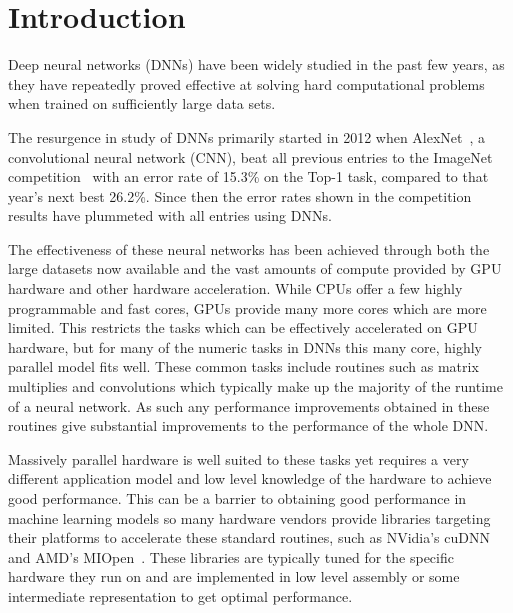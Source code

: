 \documentclass[sigconf]{acmart}
\begin{document}
\section{Introduction}

Deep neural networks (DNNs) have been widely studied in the past few years, as
they have repeatedly proved effective at solving hard computational problems
when trained on sufficiently large data sets.

The resurgence in study of DNNs primarily started in 2012 when
AlexNet~\cite{AlexNet}, a convolutional neural network (CNN), beat all previous
entries to the ImageNet competition~\cite{ILSVRC15} with an error rate of 15.3\%
on the Top-1 task, compared to that year's next best 26.2\%. Since then the
error rates shown in the competition results have plummeted with all entries
using DNNs.

The effectiveness of these neural networks has been achieved through both the
large datasets now available and the vast amounts of compute provided by GPU
hardware and other hardware acceleration. While CPUs offer a few highly
programmable and fast cores, GPUs provide many more cores which are more
limited. This restricts the tasks which can be effectively accelerated on GPU
hardware, but for many of the numeric tasks in DNNs this many core, highly
parallel model fits well. These common tasks include routines such as matrix
multiplies and convolutions which typically make up the majority of the runtime
of a neural network. As such any performance improvements obtained in these
routines give substantial improvements to the performance of the whole DNN\@.

Massively parallel hardware is well suited to these tasks yet requires a very
different application model and low level knowledge of the hardware to achieve
good performance. This can be a barrier to obtaining good performance in machine
learning models so many hardware vendors provide libraries targeting their
platforms to accelerate these standard routines, such as NVidia's
cuDNN~\cite{cudnn} and AMD's MIOpen~\cite{miopen}. These libraries are typically
tuned for the specific hardware they run on and are implemented in low level
assembly or some intermediate representation to get optimal performance.
\end{document}
